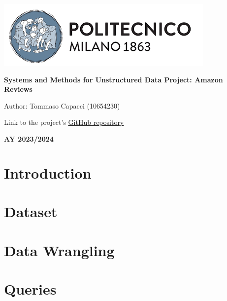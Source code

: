 \documentclass[table, 12pt]{article}
\begin{document}
\begin{titlepage}
    \centering
    \vfill
    \includegraphics[scale=0.9]{Images/PolimiLogo.png}\par\vspace{1cm}
    \vspace{1cm}
    {\huge\bfseries Systems and Methods for Unstructured Data Project: Amazon Reviews \par}
    \vspace{3cm}
    {\Large {Author: Tommaso Capacci (10654230)}\par}
    \vspace{0.5cm}
    {\Large {Link to the project's \href{https://github.com/TommasoCapacci/SMBUD_project_23-24}{\color{blue}\underline{GitHub repository}}}\par}
    \vspace{3.5cm}
    {\large \textbf{AY 2023/2024}\par}
    \vfill
\end{titlepage}
\thispagestyle{plain}
\mbox{}
\newpage
{}
\tableofcontents
\newpage
{}

\clearpage
{{\section{Introduction}}}
\label{sect:introduction}

\clearpage
{{\section{Dataset}}}
\label{sect:dataset}

\clearpage
{{\section{Data Wrangling}}}
\label{sect:wrangling}

\clearpage
{{\section{Queries}}}
\label{sect:queries}

\end{document}
